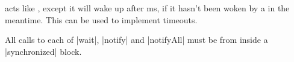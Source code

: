 \begin{slide}

 acts like , except it will wake up after
ms, if it hasn't been woken by a  in the meantime.
This can be used to implement timeouts.  




All calls to each of |wait|, |notify| and |notifyAll| must be from inside a
|synchronized| block.
\end{slide}
